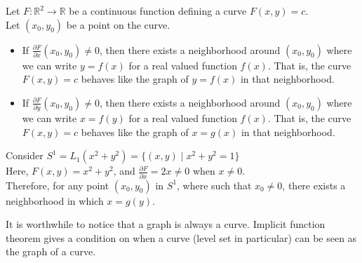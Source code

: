 \vspace{0.4cm}
\begin{theorem}
    Let $F:\mathbb{R}^2\to\mathbb{R}$ be a continuous function defining a curve $F(x,y)=c$.\\ 
    Let $(x_0,y_0)$ be a point on the curve.
    \begin{itemize}
        \item If $\frac{\partial F}{\partial x}(x_0,y_0)\neq 0$, then there exists a neighborhood around $(x_0,y_0)$ where we can write $y=f(x)$ for a real valued function $f(x)$. That is, the curve $F(x,y)=c$ behaves like the graph of $y=f(x)$ in that neighborhood.
        \item If $\frac{\partial F}{\partial y}(x_0,y_0)\neq 0$, then there exists a neighborhood around $(x_0,y_0)$ where we can write $x=f(y)$ for a real valued function $f(x)$. That is, the curve $F(x,y)=c$ behaves like the graph of $x=g(x)$ in that neighborhood.
    \end{itemize}
\end{theorem}
\vspace{0.4cm}
\begin{eg}
    Consider $S^1=L_1(x^2+y^2)=\{(x,y)\mid x^2+y^2=1\}$\\ 
    Here, $F(x,y)=x^2+y^2$, and $\frac{\partial F}{\partial x}=2x\neq 0$ when $x\neq0$.\\ 
    Therefore, for any point $(x_0,y_0)$ in $S^1$, where such that $x_0\neq0$, there exists a neighborhood in which $x=g(y)$.
\end{eg}
\vspace{0.4cm}
\begin{note}
    It is worthwhile to notice that a graph is always a curve. Implicit function theorem gives a condition on when a curve (level set in particular) can be seen as the graph of a curve.
\end{note}
\vspace{0.4cm}

